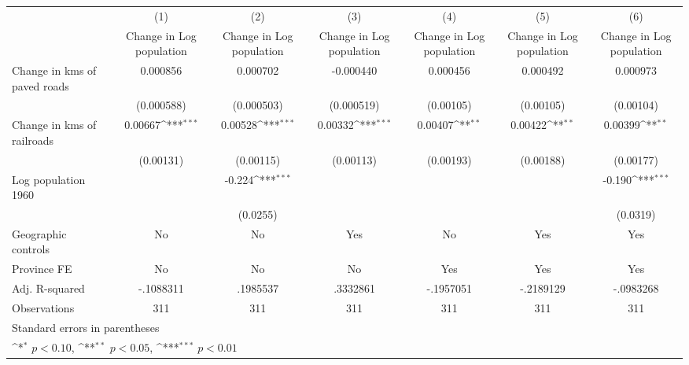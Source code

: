 {
\def\sym#1{\ifmmode^{#1}\else\(^{#1}\)\fi}
\begin{tabular}{l*{6}{c}}
\hline\hline
                    &\multicolumn{1}{c}{(1)}&\multicolumn{1}{c}{(2)}&\multicolumn{1}{c}{(3)}&\multicolumn{1}{c}{(4)}&\multicolumn{1}{c}{(5)}&\multicolumn{1}{c}{(6)}\\
                    &\multicolumn{1}{c}{Change in Log population}&\multicolumn{1}{c}{Change in Log population}&\multicolumn{1}{c}{Change in Log population}&\multicolumn{1}{c}{Change in Log population}&\multicolumn{1}{c}{Change in Log population}&\multicolumn{1}{c}{Change in Log population}\\
\hline
Change in kms of paved roads&    0.000856         &    0.000702         &   -0.000440         &    0.000456         &    0.000492         &    0.000973         \\
                    &  (0.000588)         &  (0.000503)         &  (0.000519)         &   (0.00105)         &   (0.00105)         &   (0.00104)         \\
[1em]
Change in kms of railroads&     0.00667\sym{***}&     0.00528\sym{***}&     0.00332\sym{***}&     0.00407\sym{**} &     0.00422\sym{**} &     0.00399\sym{**} \\
                    &   (0.00131)         &   (0.00115)         &   (0.00113)         &   (0.00193)         &   (0.00188)         &   (0.00177)         \\
[1em]
Log population 1960 &                     &      -0.224\sym{***}&                     &                     &                     &      -0.190\sym{***}\\
                    &                     &    (0.0255)         &                     &                     &                     &    (0.0319)         \\
\hline
Geographic controls &          No         &          No         &         Yes         &          No         &         Yes         &         Yes         \\
Province FE         &          No         &          No         &          No         &         Yes         &         Yes         &         Yes         \\
Adj. R-squared      &   -.1088311         &    .1985537         &    .3332861         &   -.1957051         &   -.2189129         &   -.0983268         \\
Observations        &         311         &         311         &         311         &         311         &         311         &         311         \\
\hline\hline
\multicolumn{7}{l}{\footnotesize Standard errors in parentheses}\\
\multicolumn{7}{l}{\footnotesize \sym{*} \(p<0.10\), \sym{**} \(p<0.05\), \sym{***} \(p<0.01\)}\\
\end{tabular}
}
